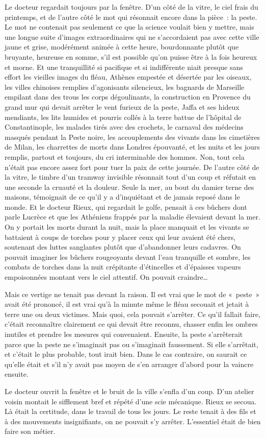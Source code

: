 \documentclass[french,twoside]{book} %
\begin{document}
Le docteur regardait toujours par la fenêtre. D’un côté de la vitre, le ciel frais du printemps, et de l’autre côté le mot qui résonnait encore dans la pièce : la peste. Le mot ne contenait pas seulement ce que la science voulait bien y mettre, mais une longue suite d’images extraordinaires qui ne s’accordaient pas avec cette ville jaune et grise, modérément animée à cette heure, bourdonnante plutôt que bruyante, heureuse en somme, s’il est possible qu’on puisse être à la fois heureux et morne. Et une tranquillité si pacifique et si indifférente niait presque sans effort les vieilles images du fléau, Athènes empestée et désertée par les oiseaux, les villes chinoises remplies d’agonisants silencieux, les bagnards de Marseille empilant dans des trous les corps dégoulinants, la construction en Provence du grand mur qui devait arrêter le vent furieux de la peste, Jaffa et ses hideux mendiants, les lits humides et pourris collés à la terre battue de l’hôpital de Constantinople, les malades tirés avec des crochets, le carnaval des médecins masqués pendant la Peste noire, les accouplements des vivants dans les cimetières de Milan, les charrettes de morts dans Londres épouvanté, et les nuits et les jours remplis, partout et toujours, du cri interminable des hommes. Non, tout cela n’était pas encore assez fort pour tuer la paix de cette journée. De l’autre côté de la vitre, le timbre d’un tramway invisible résonnait tout d’un coup et réfutait en une seconde la cruauté et la douleur. Seule la mer, au bout du damier terne des maisons, témoignait de ce qu’il y a d’inquiétant et de jamais reposé dans le monde. Et le docteur Rieux, qui regardait le golfe, pensait à ces bûchers dont parle Lucrèce et que les Athéniens frappés par la maladie élevaient devant la mer. On y portait les morts durant la nuit, mais la place manquait et les vivants se battaient à coups de torches pour y placer ceux qui leur avaient été chers, soutenant des luttes sanglantes plutôt que d’abandonner leurs cadavres. On pouvait imaginer les bûchers rougeoyants devant l’eau tranquille et sombre, les combats de torches dans la nuit crépitante d’étincelles et d’épaisses vapeurs empoisonnées montant vers le ciel attentif. On pouvait craindre…\par
Mais ce vertige ne tenait pas devant la raison. Il est vrai que le mot de « peste » avait été prononcé, il est vrai qu’à la minute même le fléau secouait et jetait à terre une ou deux victimes. Mais quoi, cela pouvait s’arrêter. Ce qu’il fallait faire, c’était reconnaître clairement ce qui devait être reconnu, chasser enfin les ombres inutiles et prendre les mesures qui convenaient. Ensuite, la peste s’arrêterait parce que la peste ne s’imaginait pas ou s’imaginait faussement. Si elle s’arrêtait, et c’était le plus probable, tout irait bien. Dans le cas contraire, on saurait ce qu’elle était et s’il n’y avait pas moyen de s’en arranger d’abord pour la vaincre ensuite.\par
Le docteur ouvrit la fenêtre et le bruit de la ville s’enfla d’un coup. D’un atelier voisin montait le sifflement bref et répété d’une scie mécanique. Rieux se secoua. Là était la certitude, dans le travail de tous les jours. Le reste tenait à des fils et à des mouvements insignifiants, on ne pouvait s’y arrêter. L’essentiel était de bien faire son métier.
\end{document}
